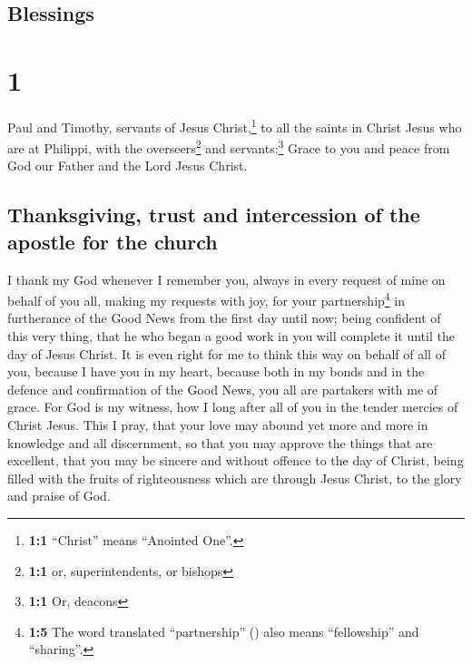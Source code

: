\hypertarget{blessings}{%
\subsection{Blessings}\label{blessings}}

\hypertarget{section}{%
\section{1}\label{section}}

 Paul and Timothy, servants of Jesus Christ,\footnote{\textbf{1:1}
  ``Christ'' means ``Anointed One''.} to all the saints in Christ Jesus
who are at Philippi, with the overseers\footnote{\textbf{1:1} or,
  superintendents, or bishops} and servants:\footnote{\textbf{1:1} Or,
  deacons}  Grace to you and peace from God our Father and
the Lord Jesus Christ.

\hypertarget{thanksgiving-trust-and-intercession-of-the-apostle-for-the-church}{%
\subsection{Thanksgiving, trust and intercession of the apostle for the
church}\label{thanksgiving-trust-and-intercession-of-the-apostle-for-the-church}}

 I thank my God whenever I remember you, 
always in every request of mine on behalf of you all, making my requests
with joy,  for your partnership\footnote{\textbf{1:5} The
  word translated ``partnership'' () also means
  ``fellowship'' and ``sharing''.} in furtherance of the Good News from
the first day until now;  being confident of this very
thing, that he who began a good work in you will complete it until the
day of Jesus Christ.  It is even right for me to think
this way on behalf of all of you, because I have you in my heart,
because both in my bonds and in the defence and confirmation of the Good
News, you all are partakers with me of grace.  For God is
my witness, how I long after all of you in the tender mercies of Christ
Jesus.  This I pray, that your love may abound yet more
and more in knowledge and all discernment,  so that you
may approve the things that are excellent, that you may be sincere and
without offence to the day of Christ,  being filled with
the fruits of righteousness which are through Jesus Christ, to the glory
and praise of God.

